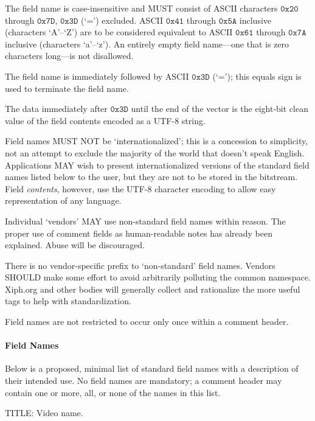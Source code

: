 \documentclass[11pt,letterpaper]{book}
\newcommand{\hex}[1]{\ensuremath{\mathtt{0x#1}}}
\numberwithin{equation}{chapter}
\numberwithin{figure}{chapter}
\numberwithin{table}{chapter}
\begin{document}
The field name is case-insensitive and MUST consist of ASCII characters
 \hex{20} through \hex{7D}, \hex{3D} (`=') excluded.
ASCII \hex{41} through \hex{5A} inclusive (characters `A'--`Z') are to be
 considered equivalent to ASCII \hex{61} through \hex{7A} inclusive
 (characters `a'--`z').
An entirely empty field name---one that is zero characters long---is not
 disallowed.

The field name is immediately followed by ASCII \hex{3D} (`='); this equals
 sign is used to terminate the field name.

The data immediately after \hex{3D} until the end of the vector is the eight-bit
 clean value of the field contents encoded as a UTF-8 string.

Field names MUST NOT be `internationalized'; this is a concession to
 simplicity, not an attempt to exclude the majority of the world that doesn't
 speak English.
Applications MAY wish to present internationalized versions of the standard
 field names listed below to the user, but they are not to be stored in the
 bitstream.
Field {\em contents}, however, use the UTF-8 character encoding to allow easy
 representation of any language.

Individual `vendors' MAY use non-standard field names within reason.
The proper use of comment fields as human-readable notes has already been
 explained.
Abuse will be discouraged.

There is no vendor-specific prefix to `non-standard' field names.
Vendors SHOULD make some effort to avoid arbitrarily polluting the common
 namespace.
Xiph.org and other bodies will generally collect and rationalize the more 
 useful tags to help with standardization.

Field names are not restricted to occur only once within a comment header.

\paragraph{Field Names}

Below is a proposed, minimal list of standard field names with a description of
 their intended use.
No field names are mandatory; a comment header may contain one or more, all, or
 none of the names in this list.

\begin{description}
\item{TITLE:} Video name.
\end{description}
\end{document}
